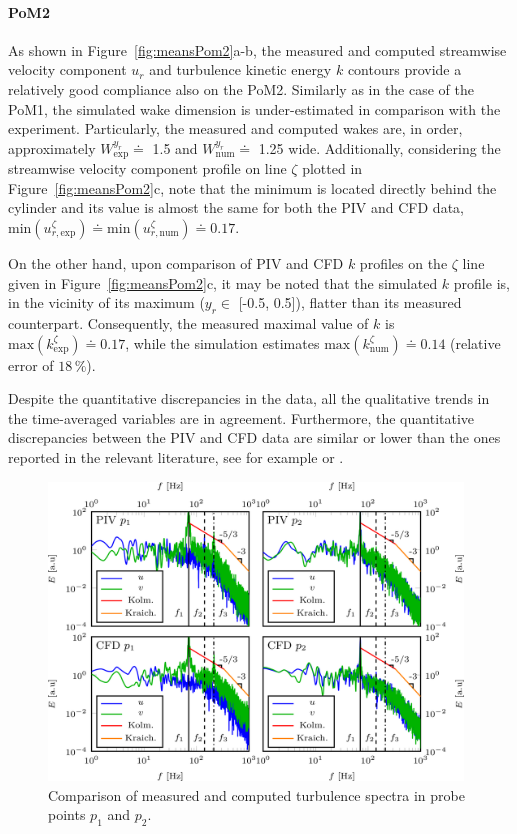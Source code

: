 \paragraph{PoM2}
As shown in Figure~\ref{fig:meansPom2}a-b, the measured and computed streamwise velocity component $u_r$ and turbulence kinetic energy $k$ contours provide {a} relatively good compliance {also on the PoM2}. Similarly as in the case of the PoM1, the simulated wake dimension is under-estimated in comparison with the experiment. Particularly, the measured and computed wakes are, in order, approximately $W_{\mathrm{exp}}^{y_{r}} \doteq$ 1.5 and $W_{\mathrm{num}}^{y_{r}} \doteq$ 1.25 wide. Additionally, considering {the} streamwise velocity component profile on line $\zeta$ {plotted} in Figure~\ref{fig:meansPom2}c, note that the minimum is located directly behind the cylinder and its value is almost {the} same for both {the} PIV and CFD data, $\mathrm{min}(u_{r,\mathrm{exp}}^{\zeta}) \doteq \mathrm{min}(u_{r,\mathrm{num}}^{\zeta})\doteq 0.17 $.

On the other hand, {upon comparison of} PIV and CFD {$k$} profiles on {the} $\zeta$ line {given} in Figure~\ref{fig:meansPom2}c, {it may be noted} that the simulated $k$ profile {is, in the vicinity of its} maximum ($y_r\in$ [-0.5, 0.5]){,} {flatter than its measured counterpart}. Consequently, the measured maximal value of $k$ is $\mathrm{max}(k_{\mathrm{exp}}^{\zeta})\doteq 0.17$, while the simulation {estimates} $\mathrm{max}(k_{\mathrm{num}}^{\zeta})\doteq 0.14$ (relative error of $18\,\%$).

Despite the quantitative discrepancies in the data, all the qualitative trends in the time-averaged variables are in agreement. Furthermore, the quantitative discrepancies between the PIV and CFD data are similar or lower than the ones reported {in the relevant literature, see }for example \citep{wen2016,gonzalez2019} or \citep{mustafa2021}.

\begin{figure}[htbp]
    \centering
    \includegraphics[width=0.98\textwidth]{02_images/00_export/figure7.png}
    \caption{Comparison of measured and computed turbulence spectra in probe points $p_{1}$ and $p_{2}$.}
    \label{fig:turbSpectraPts}
\end{figure}

